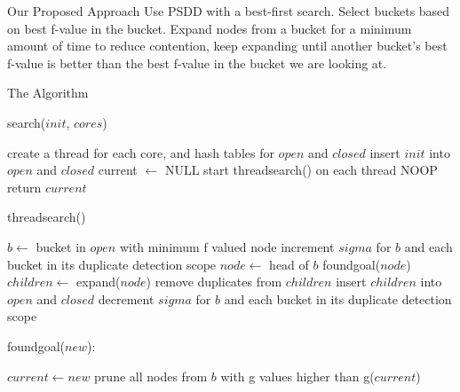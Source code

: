 \documentclass[style=simple]{powerdot}
\begin{document}
\begin{slide}{Our Proposed Approach}
  Use PSDD with a best-first search.  Select buckets based on best
  f-value in the bucket.  Expand nodes from a bucket for a minimum
  amount of time to reduce contention, keep expanding until another
  bucket's best f-value is better than the best f-value in the bucket we
  are looking at.
\end{slide}

\begin{slide}{The Algorithm}
   {
    search($init$, $cores$)
    \begin{algorithmic}[1]
      \STATE create a thread for each core, and hash tables for $open$ and $closed$
      \STATE insert $init$ into $open$ and $closed$
      \STATE current $\leftarrow$ NULL
      \STATE start threadsearch() on each thread
      \STATE NOOP
      \ENDWHILE
      \STATE return $current$
    \end{algorithmic}
  }
   {
    \begin{tiny}
    threadsearch()
    \begin{algorithmic}[1]
      \STATE $b \leftarrow$ bucket in $open$ with minimum f valued node
      \STATE increment $sigma$ for $b$ and each bucket in its duplicate detection scope
      \STATE {}
      \STATE {}
      \STATE {}
      \STATE $node \leftarrow$ head of $b$
      \STATE foundgoal($node$)
      \STATE $children \leftarrow$ expand($node$)
      \STATE remove duplicates from $children$
      \STATE insert $children$ into $open$ and $closed$
      \ENDIF
      \ENDFOR
      \STATE {}
      \STATE decrement $sigma$ for $b$ and each bucket in its duplicate detection scope
      \ENDWHILE
    \end{algorithmic}
    \end{tiny}
  }
   {
    foundgoal($new$):
    \begin{algorithmic}[1]
      \STATE $current \leftarrow new$
      \STATE prune all nodes from $b$ with g values higher than g($current$)
      \ENDIF
    \end{algorithmic}
  }
\end{slide}
\end{document}
